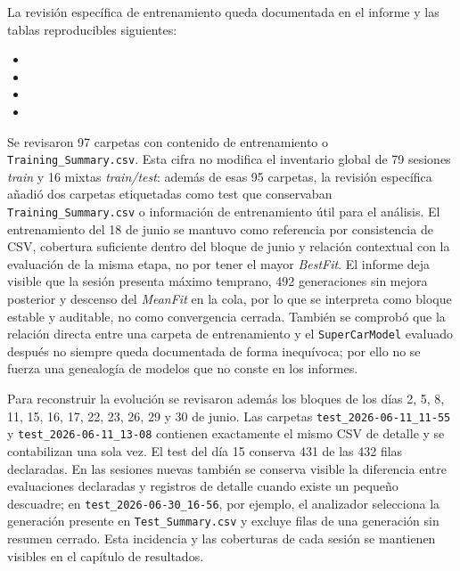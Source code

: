 La revisión específica de entrenamiento queda documentada en el informe y las tablas reproducibles siguientes:
\begin{itemize}[nosep,leftmargin=1.2cm]
    \item {}
    \item {}
    \item {}
    \item {}
\end{itemize}
Se revisaron 97 carpetas con contenido de entrenamiento o \texttt{Training\_Summary.csv}. Esta cifra no modifica el inventario global de 79 sesiones \textit{train} y 16 mixtas \textit{train/test}: además de esas 95 carpetas, la revisión específica añadió dos carpetas etiquetadas como test que conservaban \texttt{Training\_Summary.csv} o información de entrenamiento útil para el análisis. El entrenamiento del 18 de junio se mantuvo como referencia por consistencia de CSV, cobertura suficiente dentro del bloque de junio y relación contextual con la evaluación de la misma etapa, no por tener el mayor \textit{BestFit}. El informe deja visible que la sesión presenta máximo temprano, 492 generaciones sin mejora posterior y descenso del \textit{MeanFit} en la cola, por lo que se interpreta como bloque estable y auditable, no como convergencia cerrada. También se comprobó que la relación directa entre una carpeta de entrenamiento y el \texttt{SuperCarModel} evaluado después no siempre queda documentada de forma inequívoca; por ello no se fuerza una genealogía de modelos que no conste en los informes.

Para reconstruir la evolución se revisaron además los bloques de los días 2, 5, 8, 11, 15, 16, 17, 22, 23, 26, 29 y 30 de junio. Las carpetas \texttt{test\_2026-06-11\_11-55} y \texttt{test\_2026-06-11\_13-08} contienen exactamente el mismo CSV de detalle y se contabilizan una sola vez. El test del día 15 conserva 431 de las 432 filas declaradas. En las sesiones nuevas también se conserva visible la diferencia entre evaluaciones declaradas y registros de detalle cuando existe un pequeño descuadre; en \texttt{test\_2026-06-30\_16-56}, por ejemplo, el analizador selecciona la generación presente en \texttt{Test\_Summary.csv} y excluye filas de una generación sin resumen cerrado. Esta incidencia y las coberturas de cada sesión se mantienen visibles en el capítulo de resultados.

